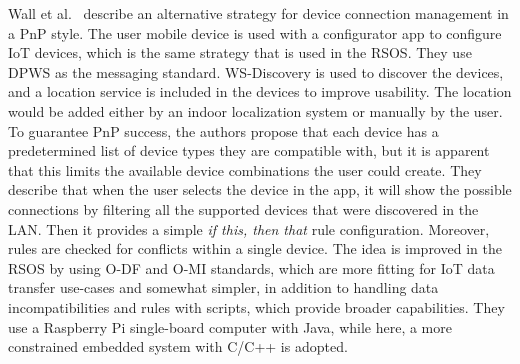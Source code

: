 Wall et al.~\cite{Decentralized_configuration_of_embedded_web_services_for_smart_home_applications} describe an alternative strategy for device connection management in a PnP style. The user mobile device is used with a configurator app to configure IoT devices, which is the same strategy that is used in the RSOS. They use DPWS as the messaging standard. WS-Discovery is used to discover the devices, and a location service is included in the devices to improve usability. The location would be added either by an indoor localization system or manually by the user. To guarantee PnP success, the authors propose that each device has a predetermined list of device types they are compatible with, but it is apparent that this limits the available device combinations the user could create. They describe that when the user selects the device in the app, it will show the possible connections by filtering all the supported devices that were discovered in the LAN. Then it provides a simple \emph{if this, then that} rule configuration. Moreover, rules are checked for conflicts within a single device. %
The idea is improved in the RSOS by using O-DF and O-MI standards, which are more fitting for IoT data transfer use-cases and somewhat simpler, in addition to handling data incompatibilities and rules with scripts, which provide broader capabilities. They use a Raspberry Pi single-board computer with Java, while here, a more constrained embedded system with C/C++ is adopted.  %




